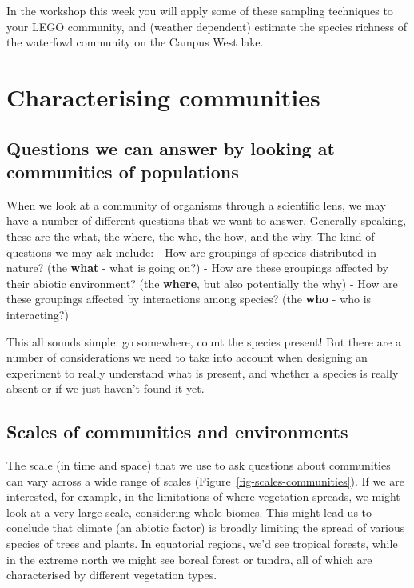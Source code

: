 \documentclass[
  letterpaper,
  DIV=11,
  numbers=noendperiod]{scrreprt}
\begin{document}
In the workshop this week you will apply some of these sampling
techniques to your LEGO community, and (weather dependent) estimate the
species richness of the waterfowl community on the Campus West lake.

\chapter{Characterising
communities}\label{sec-characterising-communities}

\section{Questions we can answer by looking at communities of
populations}\label{questions-we-can-answer-by-looking-at-communities-of-populations}

When we look at a community of organisms through a scientific lens, we
may have a number of different questions that we want to answer.
Generally speaking, these are the what, the where, the who, the how, and
the why. The kind of questions we may ask include: - How are groupings
of species distributed in nature? (the \textbf{what} - what is going
on?) - How are these groupings affected by their abiotic environment?
(the \textbf{where}, but also potentially the why) - How are these
groupings affected by interactions among species? (the \textbf{who} -
who is interacting?)

This all sounds simple: go somewhere, count the species present! But
there are a number of considerations we need to take into account when
designing an experiment to really understand what is present, and
whether a species is really absent or if we just haven't found it yet.

\section{Scales of communities and
environments}\label{scales-of-communities-and-environments}

The scale (in time and space) that we use to ask questions about
communities can vary across a wide range of scales
(Figure~\ref{fig-scales-communities}). If we are interested, for
example, in the limitations of where vegetation spreads, we might look
at a very large scale, considering whole biomes. This might lead us to
conclude that climate (an abiotic factor) is broadly limiting the spread
of various species of trees and plants. In equatorial regions, we'd see
tropical forests, while in the extreme north we might see boreal forest
or tundra, all of which are characterised by different vegetation types.
\end{document}
